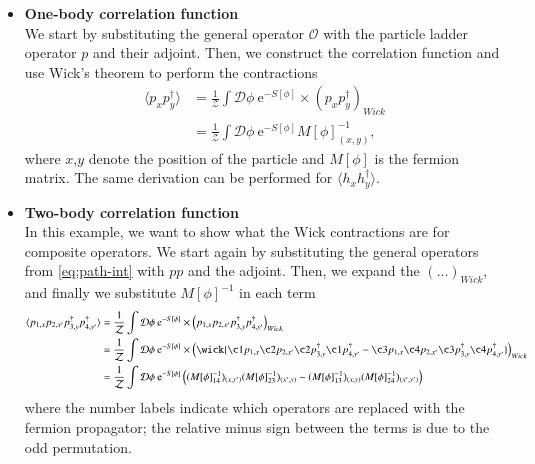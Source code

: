 \begin{itemize}
    \item \textbf{One-body correlation function}\\
    We start by substituting the general operator $\mathcal{O}$ with the particle ladder operator $p$ and their adjoint. Then, we construct the correlation function and use Wick's theorem to perform the contractions
    \begin{equation}
        \begin{aligned}
            \langle p_{x}p^\dagger_{y} \rangle &= \frac{1}{\mathcal{Z}} \int \mathcal{D}\phi \:\mathrm{e}^{-S[\phi]}\times \left(p_{x}p^\dagger_{y}\right)_{Wick} 
            \\
            &= \frac{1}{\mathcal{Z}} \int \mathcal{D}\phi \:\mathrm{e}^{-S[\phi]} M[\phi]^{-1}_{(x,y)},
        \end{aligned}
    \end{equation}
    where $x$,$y$ denote the position of the particle and $M[\phi]$ is the fermion matrix. The same derivation can be performed for $\langle h_xh^\dagger_y\rangle$.
    
    \item \textbf{Two-body correlation function}\\
    In this example, we want to show what the Wick contractions are for composite operators. We start again by substituting the general operators from \cref{eq:path-int} with $pp$ and the adjoint. Then, we expand the $\left(\dots\right)_{Wick}$, and finally we substitute $M[\phi]^{-1}$ in each term
    \begin{equation}
        \begin{aligned}
            \langle p_{1,x}p_{2,x'}p^\dagger_{3,y}p^\dagger_{4,y'} \rangle &= \frac{1}{\mathcal{Z}} \int \mathcal{D}\phi \:\mathrm{e}^{-S[\phi]}\times \left(p_{1,x}p_{2,x'}p^\dagger_{3,y}p^\dagger_{4,y'}\right)_{Wick} 
            \\
            &= \frac{1}{\mathcal{Z}} \int \mathcal{D}\phi \:\mathrm{e}^{-S[\phi]}\times \left(\wick{\c1 p_{1,x} \c2 p_{2,x'} \c2 p^\dagger_{3,y} \c1 p^\dagger_{4,y'} - \c3 p_{1,x} \c4 p_{2,x'} \c3 p^\dagger_{3,y} \c4 p^\dagger_{4,y'}}\right)_{Wick} 
            \\
            &= \frac{1}{\mathcal{Z}} \int \mathcal{D}\phi \:\mathrm{e}^{-S[\phi]} \left((M[\phi]^{-1}_{14})_{(x,y')}(M[\phi]^{-1}_{23})_{(x',y)} - (M[\phi]^{-1}_{13})_{(x,y)}(M[\phi]^{-1}_{24})_{(x',y')}\right)
        \end{aligned}
    \end{equation}
    where the number labels indicate which operators are replaced with the fermion propagator; the relative minus sign between the terms is due to the odd permutation.


\end{itemize}
